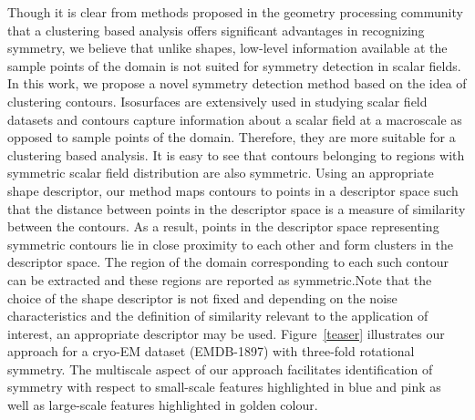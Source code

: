 \documentclass[review,journal]{vgtc}         %
\begin{document}
Though it is clear from methods proposed in the geometry processing community
that a clustering based analysis offers significant advantages in recognizing symmetry,
we believe that unlike shapes, low-level information available at the sample points of the 
domain is not suited for symmetry detection in scalar fields. In this work, we propose 
a novel symmetry detection method based on the idea of clustering contours. Isosurfaces
are extensively used in studying scalar field datasets and contours capture information 
about a scalar field at a macroscale as opposed to sample points of the domain. Therefore, they
are more suitable for a clustering based analysis. It is easy to see that contours
belonging to regions with symmetric scalar field distribution are also symmetric. Using an 
appropriate shape descriptor, our method maps contours to points in a descriptor space 
such that the distance between points in the descriptor space is a measure of similarity 
between the contours. As a result, points in the descriptor space 
representing symmetric contours lie in close 
proximity to each other and form clusters in the descriptor space. The region of the domain
corresponding to each such contour can be extracted and these regions
are reported as symmetric.Note that the choice
of the shape descriptor is not fixed and depending on the noise characteristics and the definition
of similarity relevant to the application of interest, an appropriate descriptor may be used.
Figure~\ref{teaser} illustrates our approach for a cryo-EM dataset (EMDB-1897) 
with three-fold rotational symmetry. The multiscale aspect of our approach facilitates
identification of symmetry with respect to small-scale features highlighted in blue and pink
as well as large-scale features highlighted in golden colour.
\end{document}
